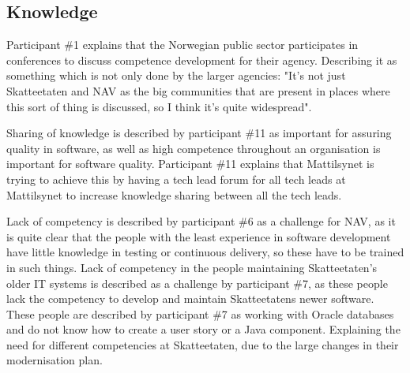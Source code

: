 \subsection{Knowledge} \label{sec:knowledge}
Participant \#1 explains that the Norwegian public sector participates in conferences to discuss competence development for their agency. Describing it as something which is not only done by the larger agencies: "It's not just Skatteetaten and NAV as the big communities that are present in places where this sort of thing is discussed, so I think it's quite widespread".


Sharing of knowledge is described by participant \#11 as important for assuring quality in software, as well as high competence throughout an organisation is important for software quality. Participant \#11 explains that Mattilsynet is trying to achieve this by having a tech lead forum for all tech leads at Mattilsynet to increase knowledge sharing between all the tech leads.


Lack of competency is described by participant \#6 as a challenge for NAV, as it is quite clear that the people with the least experience in software development have little knowledge in testing or continuous delivery, so these have to be trained in such things. Lack of competency in the people maintaining Skatteetaten's older IT systems is described as a challenge by participant \#7, as these people lack the competency to develop and maintain Skatteetatens newer software. These people are described by participant \#7 as working with Oracle databases and do not know how to create a user story or a Java component. Explaining the need for different competencies at Skatteetaten, due to the large changes in their modernisation plan.



